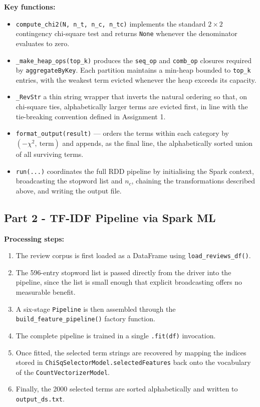 \documentclass[11pt,a4paper]{extarticle}
\begin{document}
\textbf{Key functions:}
\begin{itemize}
  \item \texttt{compute\_chi2(N, n\_t, n\_c, n\_tc)} implements the standard $2{\times}2$ contingency chi-square test and returns \texttt{None} whenever the denominator evaluates to zero.
  \item \texttt{\_make\_heap\_ops(top\_k)} produces the \texttt{seq\_op} and \texttt{comb\_op} closures required by \texttt{aggregateByKey}. Each partition maintains a min-heap bounded to \texttt{top\_k} entries, with the weakest term evicted whenever the heap exceeds its capacity.
  \item \texttt{\_RevStr} a thin string wrapper that inverts the natural ordering so that, on chi-square ties, alphabetically larger terms are evicted first, in line with the tie-breaking convention defined in Assignment 1.
  \item \texttt{format\_output(result)} --- orders the terms within each category by $(-\chi^2,\ \mathrm{term})$ and appends, as the final line, the alphabetically sorted union of all surviving terms.
  \item \texttt{run(...)} coordinates the full RDD pipeline by initialising the Spark context, broadcasting the stopword list and $n_c$, chaining the transformations described above, and writing the output file.
\end{itemize}

\subsection{Part 2 - TF-IDF Pipeline via Spark ML}

\textbf{Processing steps:}

\begin{enumerate}
    \item The review corpus is first loaded as a DataFrame using \texttt{load\_reviews\_df()}.
    \item The 596-entry stopword list is passed directly from the driver into the pipeline, since the list is small enough that explicit broadcasting offers no measurable benefit.
    \item A six-stage \texttt{Pipeline} is then assembled through the \texttt{build\_feature\_pipeline()} factory function.
    \item The complete pipeline is trained in a single \texttt{.fit(df)} invocation.
    \item Once fitted, the selected term strings are recovered by mapping the indices stored in \texttt{ChiSqSelectorModel.selectedFeatures} back onto the vocabulary of the \texttt{CountVectorizerModel}.
    \item Finally, the 2000 selected terms are sorted alphabetically and written to \texttt{output\_ds.txt}.
\end{enumerate}
\end{document}
